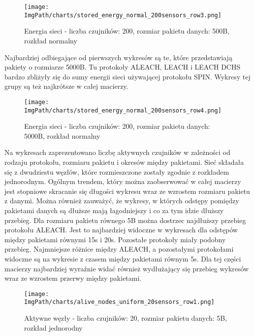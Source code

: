 \begin{figure}[H]
	\begin{center}
		\texttt{[image: \\ImgPath/charts/stored\_energy\_normal\_200sensors\_row3.png]}
	\end{center}
	\caption{Energia sieci - liczba czujników: 200, rozmiar pakietu danych: 500B, rozkład normalny}
\end{figure}

Najbardziej odbiegające od pierwszych wykresów są te, które przedstawiają pakiety o rozmiarze 5000B. Tu protokoły ALEACH, LEACH i LEACH DCHS bardzo zbliżyły się do sumy energii sieci używającej protokołu SPIN. Wykresy tej grupy są też najkrótsze w całej macierzy.

\begin{figure}[H]
	\begin{center}
		\texttt{[image: \\ImgPath/charts/stored\_energy\_normal\_200sensors\_row4.png]}
	\end{center}
	\caption{Energia sieci - liczba czujników: 200, rozmiar pakietu danych: 5000B, rozkład normalny}
\end{figure}

Na wykresach zaprezentowano liczbę aktywnych czujników w zależności od rodzaju protokołu, rozmiaru pakietu i okresów między pakietami. Sieć składała się z dwudziestu węzłów, które rozmieszczone zostały zgodnie z rozkładem jednorodnym.
Ogólnym trendem, który można zaobserwować w całej macierzy jest stopniowe skracanie się długości wykresu wraz ze wzrostem rozmiaru pakietu z danymi. Można również zauważyć, że wykresy, w których odstępy pomiędzy pakietami danych są dłuższe mają łagodniejszy i co za tym idzie dłuższy przebieg.
Dla rozmiaru pakietu równego 5B można dostrzec najdłuższy przebieg protokołu ALEACH. Jest to najbardziej widoczne w wykresach dla odstępów między pakietami równymi 15s i 20s. Pozostałe protokoły miały podobny przebieg. Najmniejsze różnice między ALEACH, a pozostałymi protokołami widoczne są na wykresie z czasem między pakietami równym 5s. Dla tej części macierzy najbardziej wyraźnie widać również wydłużający się przebieg wykresów wraz ze wzrostem przerwy między pakietami. 

\begin{figure}[H]
	\begin{center}
		\texttt{[image: \\ImgPath/charts/alive\_nodes\_uniform\_20sensors\_row1.png]}
	\end{center}
	\caption{Aktywne węzły - liczba czujników: 20, rozmiar pakietu danych: 5B, rozkład jednorodny}
\end{figure}

